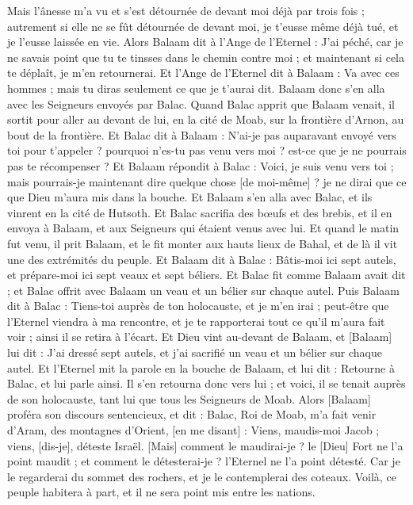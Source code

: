 \begin{multicols}{2}
Mais l'ânesse m'a vu et s'est détournée de devant moi déjà par trois fois ; autrement si elle ne se fût détournée de devant moi, je t'eusse même déjà tué, et je l'eusse laissée en vie.
Alors Balaam dit à l'Ange de l'Eternel : J'ai péché, car je ne savais point que tu te tinsses dans le chemin contre moi ; et maintenant si cela te déplaît, je m'en retournerai.
Et l'Ange de l'Eternel dit à Balaam : Va avec ces hommes ; mais tu diras seulement ce que je t'aurai dit. Balaam donc s'en alla avec les Seigneurs envoyés par Balac.
Quand Balac apprit que Balaam venait, il sortit pour aller au devant de lui, en la cité de Moab, sur la frontière d'Arnon, au bout de la frontière.
Et Balac dit à Balaam : N'ai-je pas auparavant envoyé vers toi pour t'appeler ? pourquoi n'es-tu pas venu vers moi ? est-ce que je ne pourrais pas te récompenser ?
Et Balaam répondit à Balac : Voici, je suis venu vers toi ; mais pourrais-je maintenant dire quelque chose [de moi-même] ? je ne dirai que ce que Dieu m'aura mis dans la bouche.
Et Balaam s'en alla avec Balac, et ils vinrent en la cité de Hutsoth.
Et Balac sacrifia des bœufs et des brebis, et il en envoya à Balaam, et aux Seigneurs qui étaient venus avec lui.
Et quand le matin fut venu, il prit Balaam, et le fit monter aux hauts lieux de Bahal, et de là il vit une des extrémités du peuple.
\VerseOne{}Et Balaam dit à Balac : Bâtis-moi ici sept autels, et prépare-moi ici sept veaux et sept béliers.
Et Balac fit comme Balaam avait dit ; et Balac offrit avec Balaam un veau et un bélier sur chaque autel.
Puis Balaam dit à Balac : Tiens-toi auprès de ton holocauste, et je m'en irai ; peut-être que l'Eternel viendra à ma rencontre, et je te rapporterai tout ce qu'il m'aura fait voir ; ainsi il se retira à l'écart.
Et Dieu vint au-devant de Balaam, et [Balaam] lui dit : J'ai dressé sept autels, et j'ai sacrifié un veau et un bélier sur chaque autel.
Et l'Eternel mit la parole en la bouche de Balaam, et lui dit : Retourne à Balac, et lui parle ainsi.
Il s'en retourna donc vers lui ; et voici, il se tenait auprès de son holocauste, tant lui que tous les Seigneurs de Moab.
Alors [Balaam] proféra son discours sentencieux, et dit : Balac, Roi de Moab, m'a fait venir d'Aram, des montagnes d'Orient, [en me disant] : Viens, maudis-moi Jacob ; viens, [dis-je], déteste Israël.
[Mais] comment le maudirai-je ? le [Dieu] Fort ne l'a point maudit ; et comment le détesterai-je ? l'Eternel ne l'a point détesté.
Car je le regarderai du sommet des rochers, et je le contemplerai des coteaux. Voilà, ce peuple habitera à part, et il ne sera point mis entre les nations.

\end{multicols}
